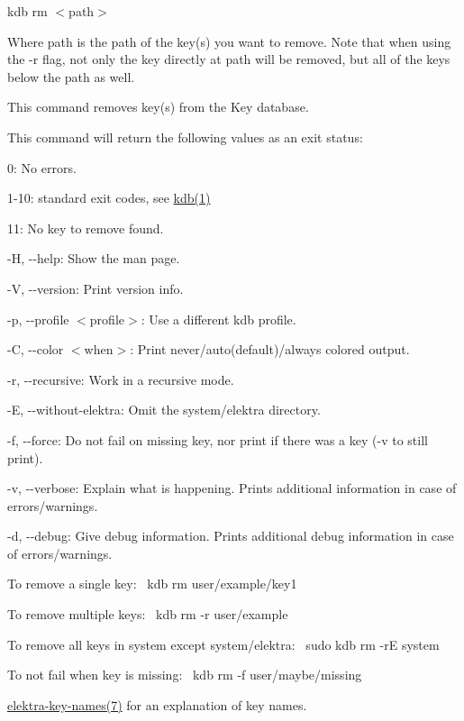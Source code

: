 {\ttfamily kdb rm $<$path$>$}

Where {\ttfamily path} is the path of the key(s) you want to remove. Note that when using the {\ttfamily -\/r} flag, not only the key directly at {\ttfamily path} will be removed, but all of the keys below the path as well.

This command removes key(s) from the Key database.

This command will return the following values as an exit status\+:


\begin{DoxyItemize}
\item 0\+: No errors.
\item 1-\/10\+: standard exit codes, see \mbox{\hyperlink{doc_help_kdb_md}{kdb(1)}}
\item 11\+: No key to remove found.
\end{DoxyItemize}


\begin{DoxyItemize}
\item {\ttfamily -\/H}, {\ttfamily -\/-\/help}\+: Show the man page.
\item {\ttfamily -\/V}, {\ttfamily -\/-\/version}\+: Print version info.
\item {\ttfamily -\/p}, {\ttfamily -\/-\/profile $<$profile$>$}\+: Use a different kdb profile.
\item {\ttfamily -\/C}, {\ttfamily -\/-\/color $<$when$>$}\+: Print never/auto(default)/always colored output.
\item {\ttfamily -\/r}, {\ttfamily -\/-\/recursive}\+: Work in a recursive mode.
\item {\ttfamily -\/E}, {\ttfamily -\/-\/without-\/elektra}\+: Omit the {\ttfamily system/elektra} directory.
\item {\ttfamily -\/f}, {\ttfamily -\/-\/force}\+: Do not fail on missing key, nor print if there was a key (-\/v to still print).
\item {\ttfamily -\/v}, {\ttfamily -\/-\/verbose}\+: Explain what is happening. Prints additional information in case of errors/warnings.
\item {\ttfamily -\/d}, {\ttfamily -\/-\/debug}\+: Give debug information. Prints additional debug information in case of errors/warnings.
\end{DoxyItemize}

To remove a single key\+:~\newline
 {\ttfamily kdb rm user/example/key1}

To remove multiple keys\+:~\newline
 {\ttfamily kdb rm -\/r user/example}

To remove all keys in {\ttfamily system} except {\ttfamily system/elektra}\+:~\newline
 {\ttfamily sudo kdb rm -\/rE system}

To not fail when key is missing\+:~\newline
 {\ttfamily kdb rm -\/f user/maybe/missing}


\begin{DoxyItemize}
\item \mbox{\hyperlink{doc_help_elektra-key-names_md}{elektra-\/key-\/names(7)}} for an explanation of key names. 
\end{DoxyItemize}